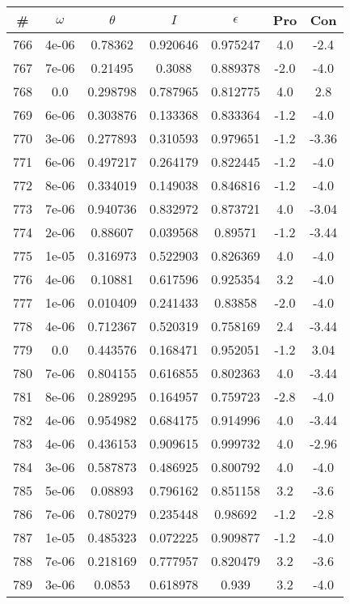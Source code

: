 \begin{table}
\begin{tabular}{c|c|c|c|c|c|c}
\# & $\omega$ & $\theta$ & $I$ & $\epsilon$ & Pro & Con\\
\hline
766 & 4e-06 & 0.78362 & 0.920646 & 0.975247 & 4.0 & -2.4\\
767 & 7e-06 & 0.21495 & 0.3088 & 0.889378 & -2.0 & -4.0\\
768 & 0.0 & 0.298798 & 0.787965 & 0.812775 & 4.0 & 2.8\\
769 & 6e-06 & 0.303876 & 0.133368 & 0.833364 & -1.2 & -4.0\\
770 & 3e-06 & 0.277893 & 0.310593 & 0.979651 & -1.2 & -3.36\\
771 & 6e-06 & 0.497217 & 0.264179 & 0.822445 & -1.2 & -4.0\\
772 & 8e-06 & 0.334019 & 0.149038 & 0.846816 & -1.2 & -4.0\\
773 & 7e-06 & 0.940736 & 0.832972 & 0.873721 & 4.0 & -3.04\\
774 & 2e-06 & 0.88607 & 0.039568 & 0.89571 & -1.2 & -3.44\\
775 & 1e-05 & 0.316973 & 0.522903 & 0.826369 & 4.0 & -4.0\\
776 & 4e-06 & 0.10881 & 0.617596 & 0.925354 & 3.2 & -4.0\\
777 & 1e-06 & 0.010409 & 0.241433 & 0.83858 & -2.0 & -4.0\\
778 & 4e-06 & 0.712367 & 0.520319 & 0.758169 & 2.4 & -3.44\\
779 & 0.0 & 0.443576 & 0.168471 & 0.952051 & -1.2 & 3.04\\
780 & 7e-06 & 0.804155 & 0.616855 & 0.802363 & 4.0 & -3.44\\
781 & 8e-06 & 0.289295 & 0.164957 & 0.759723 & -2.8 & -4.0\\
782 & 4e-06 & 0.954982 & 0.684175 & 0.914996 & 4.0 & -3.44\\
783 & 4e-06 & 0.436153 & 0.909615 & 0.999732 & 4.0 & -2.96\\
784 & 3e-06 & 0.587873 & 0.486925 & 0.800792 & 4.0 & -4.0\\
785 & 5e-06 & 0.08893 & 0.796162 & 0.851158 & 3.2 & -3.6\\
786 & 7e-06 & 0.780279 & 0.235448 & 0.98692 & -1.2 & -2.8\\
787 & 1e-05 & 0.485323 & 0.072225 & 0.909877 & -1.2 & -4.0\\
788 & 7e-06 & 0.218169 & 0.777957 & 0.820479 & 3.2 & -3.6\\
789 & 3e-06 & 0.0853 & 0.618978 & 0.939 & 3.2 & -4.0\\

\end{tabular}
\end{table}
